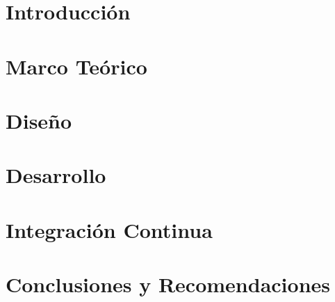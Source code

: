 \documentclass{report}
\begin{document}
  

  \chapter{Introducción}
  

  \chapter{Marco Teórico}
  

  \chapter{Diseño}
  

  \chapter{Desarrollo}
  

  \chapter{Integración Continua}
  

  \chapter{Conclusiones y Recomendaciones}
  

  
\end{document}
